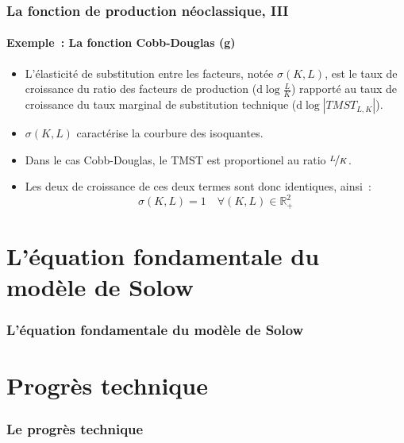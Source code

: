 \documentclass[10pt,notheorems]{beamer}
\theoremstyle{plain}
\theoremstyle{definition} %
\begin{document}
\begin{frame}
  \frametitle{La fonction de production néoclassique, III}
  \framesubtitle{Exemple~: La fonction Cobb-Douglas (g)}

  \medskip

  \begin{itemize}

  \item L'élasticité de substitution entre les facteurs, notée $\sigma(K,L)$, est le taux de croissance du ratio des facteurs de production ($\mathrm d \log \frac{L}{K}$) rapporté au taux de croissance du taux marginal de substitution technique ($\mathrm d \log |TMST_{L,K}|$).\newline

  \item $\sigma(K,L)$ caractérise la courbure des isoquantes.\newline

  \item Dans le cas Cobb-Douglas, le TMST est proportionel au ratio $\nicefrac{L}{K}$.\newline

  \item Les deux de croissance de ces deux termes sont donc identiques, ainsi~:
    \[
      \sigma(K,L) = 1\quad \forall (K,L) \in \mathbb R_+^2
    \]
  \end{itemize}
\end{frame}




\section{L'équation fondamentale du modèle de Solow}

\begin{frame}
  \frametitle{L'équation fondamentale du modèle de Solow}

\end{frame}


\section{Progrès technique}

\begin{frame}
  \frametitle{Le progrès technique}

\end{frame}
\end{document}
